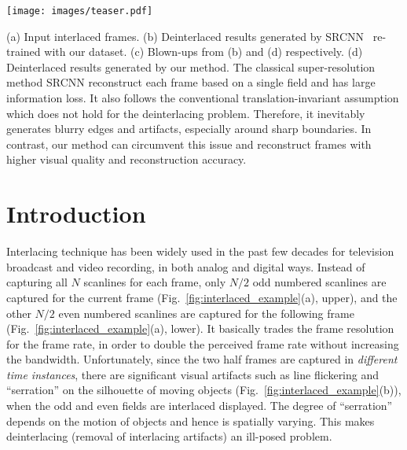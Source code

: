\documentclass[acmtog]{acmart}
\begin{document}






\begin{teaserfigure}
  \texttt{[image: images/teaser.pdf]}
  \caption{(a) Input interlaced frames. (b) Deinterlaced results generated by SRCNN~\cite{dong2016image} re-trained with our dataset. (c) Blown-ups from (b) and (d) respectively. (d) Deinterlaced results generated by our method. The classical super-resolution method SRCNN reconstruct each frame based on a single field and has large information loss. It also follows the conventional translation-invariant assumption which does not hold for the deinterlacing problem. Therefore, it inevitably generates blurry edges and artifacts, especially around sharp boundaries. In contrast, our method can circumvent this issue and reconstruct frames with higher visual quality and reconstruction accuracy.}
  \label{fig:teaser}
\end{teaserfigure}

\maketitle

\section{Introduction}


Interlacing technique has been widely used in the past few decades for television
broadcast and video recording, in both analog and digital ways. Instead of capturing all
$N$ scanlines for each frame, only $N/2$ odd numbered scanlines are captured for
the current frame (Fig.~\ref{fig:interlaced_example}(a), upper), and the other
$N/2$ even numbered scanlines are captured for the following frame
(Fig.~\ref{fig:interlaced_example}(a), lower). It basically trades the frame
resolution for the frame rate, in order to double the perceived frame rate
without increasing the bandwidth. Unfortunately, since the two half frames are
captured in {\em different time instances}, there are significant visual
artifacts such as line flickering and ``serration'' on the silhouette of moving
objects (Fig.~\ref{fig:interlaced_example}(b)), when the odd and even fields are
interlaced displayed. The degree of ``serration'' depends on the motion of objects
and hence is spatially varying. This makes deinterlacing (removal of interlacing artifacts) an ill-posed problem.
\end{document}

